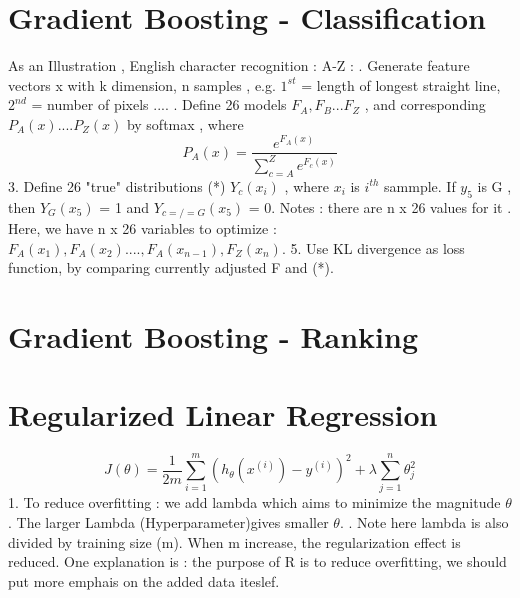 \documentclass{article}
\begin{document}
\section{Gradient Boosting - Classification}
As an Illustration , English character recognition : A-Z  : . Generate feature vectors  x with k dimension, n samples , e.g. \(1^{st}\) = length of longest straight line,  \(2^{nd}\) = number of pixels .... . Define 26 models \(F_A,F_B...F_Z\) , and corresponding \(P_A(x) .... P_Z(x) \)  by softmax , where
\[ P_A(x) = \frac{e^{F_A(x)}}{\sum_{c=A}^{Z} e^{F_c(x)}}\]
3. Define 26 "true" distributions (*) \(Y_c(x_i)\) , where \(x_i\) is \(i^{th}\) sammple. If \(y_5\) is G , then  \(Y_G(x_5)\) = 1 and \(Y_{c=/=G}(x_5)\) = 0. Notes : there are n x 26 values for it . Here, we have n x 26 variables to optimize : \(F_A(x_1),F_A(x_2)....,F_A(x_{n-1}), F_Z(x_n)\). 
5. Use KL divergence as  loss function, by comparing currently adjusted F and (*).
\section{Gradient Boosting - Ranking}
\section{Regularized Linear Regression}
\[J(\theta) = \frac{1}{2m}  \sum_{i=1}^{m} \left( h_{\theta}(x^{(i)}) - y^{(i)} \right)^2 + \lambda \sum_{j=1}^{n} \theta_{j}^2 \]
1. To reduce overfitting : we add lambda which aims to minimize the magnitude \(\theta\). The larger Lambda (Hyperparameter)gives smaller \(\theta\). . Note here lambda is also divided by training size (m). When m increase, the regularization effect is reduced. One explanation is : the purpose of R is to reduce overfitting, we should put more emphais on the added data iteslef. 
\end{document}
